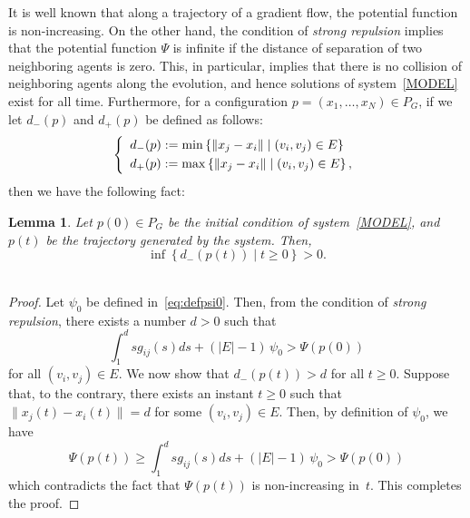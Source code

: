 \documentclass[10pt,twocolumn,twoside]{IEEEtran}
\newtheorem{lem}{Lemma}
\renewcommand{\(}{\left (}
\renewcommand{\)}{\right )}
\renewcommand{\;}{\,;\,}
\begin{document}
It is well known that along a trajectory of a gradient flow, the potential function is non-increasing. On the other hand, the condition of {\it strong repulsion} implies that the potential function $\Psi$ is infinite if the distance of separation of two neighboring agents is zero. This, in particular, implies that there is no collision of neighboring agents along the evolution, and hence solutions of system~\eqref{MODEL} exist for all time. 
Furthermore, for a configuration $p = (x_1,\ldots, x_N)\in P_G$, if we let $d_-(p)$ and $d_+(p)$ be defined as follows: 
\begin{equation}\label{eq:defd-d+}
\left \{
\begin{array}{l}
d_-(p) := \min \left \{  \|x_j - x_i\| \mid  (v_i, v_j)\in E   \right \} \vspace{3pt} \\
d_+(p) := \max \left \{  \|x_j - x_i\| \mid  (v_i, v_j)\in E   \right \}, 
\end{array}
\right.
\end{equation} 
then we have the following fact:


\begin{lem}\label{ELB} 
Let $p(0)\in P_G$ be the initial condition of system~\eqref{MODEL}, and $p(t)$ be the trajectory generated by the system. Then, 
$$
\inf \left\{  d_-(p(t))  \mid t\ge 0 \right \} > 0. 
$$\,
\end{lem}

\begin{proof}
Let $\psi_0$ be defined in~\eqref{eq:defpsi0}. Then, from the condition of {\it strong repulsion}, there exists a number $d > 0$ such that
$$
\int^d_{1}  s g_{ij}(s) ds + \(|E| - 1\)\, \psi_0 > \Psi(p(0))
$$
for all $(v_i,v_j) \in E$. We now show that 
$
d_-(p(t))  > d$ for all  $t \ge 0$.  
Suppose that, to the contrary, there exists an instant $t\ge 0$ such that $\|x_j(t) - x_i(t)\| = d$ for some $(v_i,v_j)\in E$. Then, by definition of $\psi_0$, we have
$$
\Psi(p(t)) \ge  \int^d_{1}  sg_{ij}(s) ds + \(|E| - 1\)\, \psi_0 > \Psi(p(0))
$$
which contradicts the fact that $\Psi(p(t))$ is non-increasing in~$t$. This completes the proof.
\end{proof}
\end{document}
